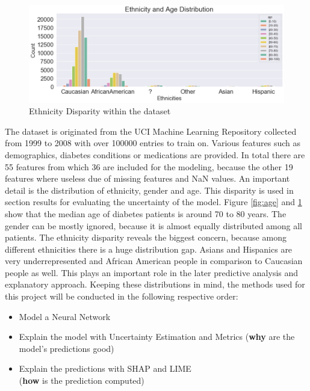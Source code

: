 \documentclass[journal]{IEEEtran}
\begin{document}
\begin{figure}
	\centering
	\includegraphics[width=1\linewidth]{../imgs/ethnicities_new}
	\caption{Ethnicity Disparity within the dataset}
	\label{fig:eth}
\end{figure}

\noindent The dataset is originated from the UCI Machine Learning Repository \cite{uci} collected from 1999 to 2008 with over 100000 entries to train on. Various features such as demographics, diabetes conditions or medications are provided. In total there are 55 features from which 36 are included for the modeling, because the other 19 features where useless due of missing features and NaN values. An important detail is the distribution of ethnicity, gender and age. This disparity is used in section results for evaluating the uncertainty of the model. Figure \ref{fig:age} and \ref{fig:eth} show that the median age of diabetes patients is around 70 to 80 years. The gender can be mostly ignored, because it is almost equally distributed among all patients. The ethnicity disparity reveals the biggest concern, because among different ethnicities there is a huge distribution gap. Asians and Hispanics are very underrepresented and African American people in comparison to Caucasian people as well. This plays an important role in the later predictive analysis and explanatory approach. Keeping these distributions in mind, the methods used for this project will be conducted in the following respective order: \\

\begin{itemize}
	\item Model a Neural Network 
	\item Explain the model with Uncertainty Estimation and Metrics (\textbf{why} are the model's predictions good)
	\item Explain the predictions with SHAP and LIME \\ (\textbf{how} is the prediction computed) \\
\end{itemize}
\end{document}
